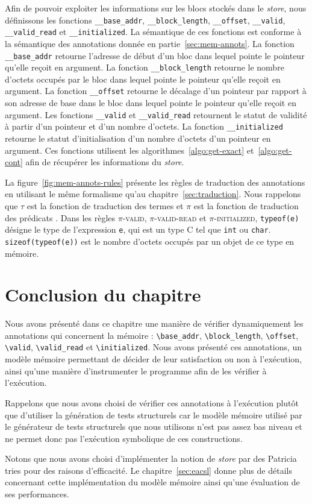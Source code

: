 Afin de pouvoir exploiter les informations sur les blocs stockés dans le
\textit{store}, nous définissons les fonctions \lstinline'__base_addr',
\lstinline'__block_length', \lstinline'__offset', \lstinline'__valid',
\lstinline'__valid_read' et \lstinline'__initialized'.
La sémantique de ces fonctions est conforme à la sémantique des annotations
\eacsl donnée en partie~\ref{sec:mem-annots}.
La fonction \lstinline'__base_addr' retourne l'adresse de début d'un bloc dans
lequel pointe le pointeur qu'elle reçoit en argument.
La fonction \lstinline'__block_length' retourne le nombre d'octets occupés par
le bloc dans lequel pointe le pointeur qu'elle reçoit en argument.
La fonction \lstinline'__offset' retourne le décalage d'un pointeur par rapport
à son adresse de base dans le bloc dans lequel pointe le pointeur qu'elle reçoit
en argument.
Les fonctions \lstinline'__valid' et \lstinline'__valid_read'
retournent le statut de validité à partir d'un pointeur et d'un nombre d'octets.
La fonction \lstinline'__initialized' retourne le statut d'initialisation
d'un nombre d'octets d'un pointeur en argument.
Ces fonctions utilisent les algorithmes~\ref{algo:get-exact}
et~\ref{algo:get-cont} afin de récupérer les informations du {\em store}.

La figure~\ref{fig:mem-annots-rules} présente les règles de traduction des
annotations en utilisant le même formalisme qu'au chapitre~\ref{sec:traduction}.
Nous rappelons que $\tau$ est la fonction de traduction des termes \eacsl et
$\pi$ est la fonction de traduction des prédicats \eacsl.
Dans les règles \textsc{$\pi$-valid}, \textsc{$\pi$-valid-read} et
\textsc{$\pi$-initialized}, \lstinline'typeof(e)' désigne le type de
l'expression \lstinline'e', qui est un type C tel que \lstinline'int' ou
\lstinline'char'.
\lstinline'sizeof(typeof(e))' est le nombre d'octets occupés par un objet
de ce type en mémoire.


\section*{Conclusion du chapitre}


Nous avons présenté dans ce chapitre une manière de vérifier dynamiquement les
annotations \eacsl qui concernent la mémoire : \lstinline'\base_addr',
\lstinline'\block_length', \lstinline'\offset', \lstinline'\valid',
\lstinline'\valid_read' et \lstinline'\initialized'.
Nous avons présenté ces annotations, un modèle mémoire permettant de décider de
leur satisfaction ou non à l'exécution, ainsi qu'une manière d'instrumenter le
programme afin de les vérifier à l'exécution.

Rappelons que nous avons choisi de vérifier ces annotations à l'exécution plutôt
que d'utiliser la génération de tests structurels car le modèle mémoire utilisé
par le générateur de tests structurels que nous utilisons n'est pas assez bas
niveau et ne permet donc pas l'exécution symbolique de ces constructions.

Notons que nous avons choisi d'implémenter la notion de {\em store} par des
Patricia tries pour des raisons d'efficacité.
Le chapitre~\ref{sec:eacsl} donne plus de détails concernant cette
implémentation du modèle mémoire ainsi qu'une évaluation de ses performances.
